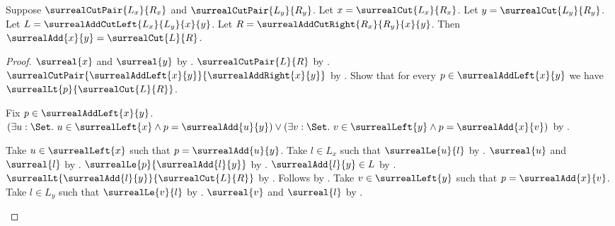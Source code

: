 \begin{theorem}\label{surreal_add_general_cut_equation}
    Suppose $\surrealCutPair{L_x}{R_x}$ and
        $\surrealCutPair{L_y}{R_y}$.
    Let $x=\surrealCut{L_x}{R_x}$.
    Let $y=\surrealCut{L_y}{R_y}$.
    Let $L=\surrealAddCutLeft{L_x}{L_y}{x}{y}$.
    Let $R=\surrealAddCutRight{R_x}{R_y}{x}{y}$.
    Then $\surrealAdd{x}{y}=\surrealCut{L}{R}$.
\end{theorem}
\begin{proof}
    $\surreal{x}$ and $\surreal{y}$
        by .
    $\surrealCutPair{L}{R}$
        by .
    $\surrealCutPair{\surrealAddLeft{x}{y}}
        {\surrealAddRight{x}{y}}$
        by .
    Show that for every $p\in\surrealAddLeft{x}{y}$ we have
        $\surrealLt{p}{\surrealCut{L}{R}}$.
    \begin{subproof}
        Fix $p\in\surrealAddLeft{x}{y}$.
        $(\exists u:\Set.\ u\in\surrealLeft{x}\land
                p=\surrealAdd{u}{y})
            \lor
            (\exists v:\Set.\ v\in\surrealLeft{y}\land
                p=\surrealAdd{x}{v})$
            by .
        \begin{byCase}
                Take $u\in\surrealLeft{x}$ such that
                    $p=\surrealAdd{u}{y}$.
                Take $l\in L_x$ such that $\surrealLe{u}{l}$
                    by .
                $\surreal{u}$ and $\surreal{l}$
                    by .
                $\surrealLe{p}{\surrealAdd{l}{y}}$
                    by .
                $\surrealAdd{l}{y}\in L$
                    by .
                $\surrealLt{\surrealAdd{l}{y}}{\surrealCut{L}{R}}$
                    by .
                Follows by
                    .
                Take $v\in\surrealLeft{y}$ such that
                    $p=\surrealAdd{x}{v}$.
                Take $l\in L_y$ such that $\surrealLe{v}{l}$
                    by .
                $\surreal{v}$ and $\surreal{l}$
                    by .

\end{byCase}
\end{subproof}
\end{proof}

